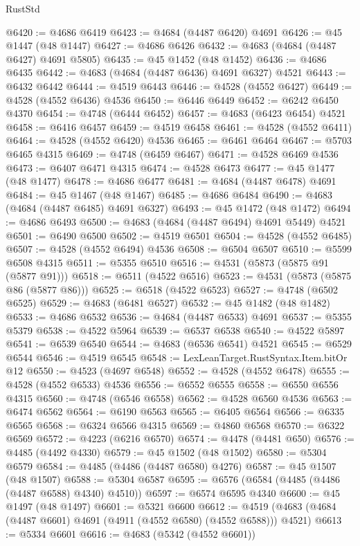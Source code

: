 \begin{lexlean}{RustStd}
\begin{coremodule}
@6420 := @4686 @6419
@6423 := @4684 (@4487 @6420) @4691
@6426 := @45 @1447 (@48 @1447)
@6427 := @4686 @6426
@6432 := @4683 (@4684 (@4487 @6427) @4691 @5805)
@6435 := @45 @1452 (@48 @1452)
@6436 := @4686 @6435
@6442 := @4683 (@4684 (@4487 @6436) @4691 @6327) @4521
@6443 := @6432 @6442
@6444 := @4519 @6443
@6446 := @4528 (@4552 @6427)
@6449 := @4528 (@4552 @6436) @4536
@6450 := @6446 @6449
@6452 := @6242 @6450 @4370
@6454 := @4748 (@6444 @6452)
@6457 := @4683 (@6423 @6454) @4521
@6458 := @6416 @6457
@6459 := @4519 @6458
@6461 := @4528 (@4552 @6411)
@6464 := @4528 (@4552 @6420) @4536
@6465 := @6461 @6464
@6467 := @5703 @6465 @4315
@6469 := @4748 (@6459 @6467)
@6471 := @4528 @6469 @4536
@6473 := @6407 @6471 @4315
@6474 := @4528 @6473
@6477 := @45 @1477 (@48 @1477)
@6478 := @4686 @6477
@6481 := @4684 (@4487 @6478) @4691
@6484 := @45 @1467 (@48 @1467)
@6485 := @4686 @6484
@6490 := @4683 (@4684 (@4487 @6485) @4691 @6327)
@6493 := @45 @1472 (@48 @1472)
@6494 := @4686 @6493
@6500 := @4683 (@4684 (@4487 @6494) @4691 @5449) @4521
@6501 := @6490 @6500
@6502 := @4519 @6501
@6504 := @4528 (@4552 @6485)
@6507 := @4528 (@4552 @6494) @4536
@6508 := @6504 @6507
@6510 := @5599 @6508 @4315
@6511 := @5355 @6510
@6516 := @4531 (@5873 (@5875 @91 (@5877 @91)))
@6518 := @6511 (@4522 @6516)
@6523 := @4531 (@5873 (@5875 @86 (@5877 @86)))
@6525 := @6518 (@4522 @6523)
@6527 := @4748 (@6502 @6525)
@6529 := @4683 (@6481 @6527)
@6532 := @45 @1482 (@48 @1482)
@6533 := @4686 @6532
@6536 := @4684 (@4487 @6533) @4691
@6537 := @5355 @5379
@6538 := @4522 @5964
@6539 := @6537 @6538
@6540 := @4522 @5897
@6541 := @6539 @6540
@6544 := @4683 (@6536 @6541) @4521
@6545 := @6529 @6544
@6546 := @4519 @6545
@6548 := LexLeanTarget.RustSyntax.Item.bitOr @12
@6550 := @4523 (@4697 @6548)
@6552 := @4528 (@4552 @6478)
@6555 := @4528 (@4552 @6533) @4536
@6556 := @6552 @6555
@6558 := @6550 @6556 @4315
@6560 := @4748 (@6546 @6558)
@6562 := @4528 @6560 @4536
@6563 := @6474 @6562
@6564 := @6190 @6563
@6565 := @6405 @6564
@6566 := @6335 @6565
@6568 := @6324 @6566 @4315
@6569 := @4860 @6568
@6570 := @6322 @6569
@6572 := @4223 (@6216 @6570)
@6574 := @4478 (@4481 @650)
@6576 := @4485 (@4492 @4330)
@6579 := @45 @1502 (@48 @1502)
@6580 := @5304 @6579
@6584 := @4485 (@4486 (@4487 @6580) @4276)
@6587 := @45 @1507 (@48 @1507)
@6588 := @5304 @6587
@6595 := @6576 (@6584 (@4485 (@4486 (@4487 @6588) @4340) @4510))
@6597 := @6574 @6595 @4340
@6600 := @45 @1497 (@48 @1497)
@6601 := @5321 @6600
@6612 := @4519 (@4683 (@4684 (@4487 @6601) @4691 (@4911 (@4552 @6580) (@4552 @6588))) @4521)
@6613 := @5334 @6601
@6616 := @4683 (@5342 (@4552 @6601))

\end{coremodule}
\end{lexlean}
